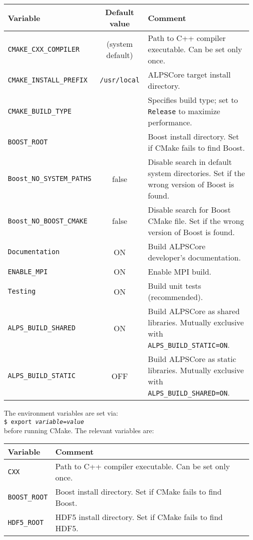 \documentclass[12pt]{article}
\newcommand{\code}[1]{\texttt{#1}}
\begin{document}
{\small
\begin{tabularx}{\textwidth}{lcX}
  \textbf{Variable} & \textbf{Default value} & {\hfil\textbf{Comment}\hfil}\\
  \toprule
  \code{CMAKE\_CXX\_COMPILER} & (system default) & {Path to C++ compiler executable.
    Can be set only once.} \\\midrule
  \code{CMAKE\_INSTALL\_PREFIX} & \code{/usr/local} & ALPSCore target install directory. \\\midrule
  \code{CMAKE\_BUILD\_TYPE} &  &  {Specifies build type;
    set to \code{Release} to maximize performance.} \\\midrule
  \code{BOOST\_ROOT} &   & {Boost install directory.
    Set if CMake fails to find Boost.} \\\midrule
  \code{Boost\_NO\_SYSTEM\_PATHS} & false & {Disable search in default system directories.
    Set if the wrong version of Boost is found.} \\\midrule
  \code{Boost\_NO\_BOOST\_CMAKE} & false & {Disable search for Boost CMake file.
    Set if the wrong version of Boost is found.} \\\midrule
  \code{Documentation} & ON & Build ALPSCore developer's documentation. \\\midrule
  \code{ENABLE\_MPI} & ON & Enable MPI build. \\\midrule
  \code{Testing} & ON & Build unit tests (recommended). \\\midrule
  \code{ALPS\_BUILD\_SHARED} & ON & {Build ALPSCore as shared libraries.
    Mutually exclusive with \code{ALPS\_BUILD\_STATIC=ON}.} \\\midrule
  \code{ALPS\_BUILD\_STATIC} & OFF & {Build ALPSCore as static libraries.
    Mutually exclusive with \code{ALPS\_BUILD\_SHARED=ON}.} \\
  \bottomrule
\end{tabularx}
}

\vspace{2\baselineskip}
The environment variables are set via:\\
\code{\$ export \textit{variable}=\textit{value}}\\
before running CMake. The relevant
variables are:

{\small
  \begin{tabularx}{1\textwidth}{l@{\hspace{5em}}X}
    \textbf{Variable} & {\hfil\textbf{Comment}\hfil}\\
    \toprule
    \code{CXX} &  Path to C++ compiler executable.
                 Can be set only once. \\\midrule
    \code{BOOST\_ROOT} &  Boost install directory.
                        Set if CMake fails to find Boost. \\\midrule
    \code{HDF5\_ROOT}  &  HDF5 install directory.
                        Set if CMake fails to find HDF5.\\

    \bottomrule
  \end{tabularx}
}
\end{document}
